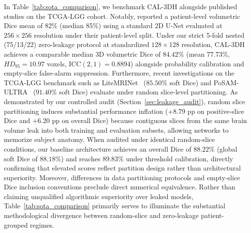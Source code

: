 \documentclass[preprint,12pt,authoryear]{elsarticle}
\begin{document}
In Table~\ref{tab:sota_comparison}, we benchmark CAL-3DH alongside published studies on the TCGA-LGG cohort. Notably, \citet{buda2019association} reported a patient-level volumetric Dice mean of 82\% (median 85\%) using a standard 2D U-Net evaluated at $256 \times 256$ resolution under their patient-level split. Under our strict 5-fold nested (75/13/22) zero-leakage protocol at standardized $128 \times 128$ resolution, CAL-3DH achieves a comparable median 3D volumetric Dice of $84.42\%$ (mean $77.73\%$, $HD_{95} = 10.97$ voxels, $\text{ICC}(2, 1) = 0.8894$) alongside probability calibration and empty-slice false-alarm suppression. Furthermore, recent investigations on the TCGA-LGG benchmark such as LiteMRINet~\citep{yuan2025enhanced} ($85.50\%$ soft Dice) and PoSAM-ULTRA~\citep{alhatamleh2026attention} ($91.40\%$ soft Dice) evaluate under random slice-level partitioning. As demonstrated by our controlled audit (Section~\ref{sec:leakage_audit}), random slice partitioning induces substantial performance inflation ($+8.79\text{ pp}$ on positive-slice Dice and $+6.20\text{ pp}$ on overall Dice) because contiguous slices from the same brain volume leak into both training and evaluation subsets, allowing networks to memorize subject anatomy. When audited under identical random-slice conditions, our baseline architecture achieves an overall Dice of $88.22\%$ (global soft Dice of $88.18\%$) and reaches $89.83\%$ under threshold calibration, directly confirming that elevated scores reflect partition design rather than architectural superiority. Moreover, differences in data partitioning protocols and empty-slice Dice inclusion conventions preclude direct numerical equivalence. Rather than claiming unqualified algorithmic superiority over leaked models, Table~\ref{tab:sota_comparison} primarily serves to illuminate the substantial methodological divergence between random-slice and zero-leakage patient-grouped regimes.
\end{document}
